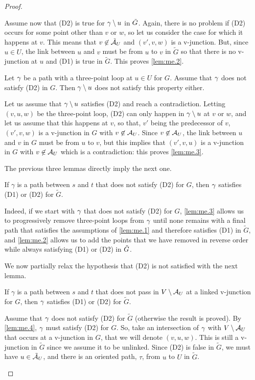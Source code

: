 \begin{proof}
\begin{enumerate}[label={\it Step \arabic*.}]
Assume now that (D2) is true for $\gamma\setminus u$ in ${\tilde{G}}$. Again, there
is no problem if (D2) occurs for some point other than $v$ or $w$, so
let us consider the case for which it happens at $v$. This means that 
$v\not\in \tilde {{\mathcal A}}_U$ and $(v',v,w)$ is a v-junction. But, since
$u\in U$, the link between $u$ and $v$ must be from $u$ to $v$ in
$\tilde G$ so that
there is no v-junction at $u$ and (D1) is true in $\tilde G$. This proves 
\cref{lem:me.2}.

\begin{lemma}
\label{lem:me.3}
Let $\gamma$ be a path with a three-point loop at
$u\in U$ for $G$. Assume that $\gamma$ does not satisfy (D2) in $G$. Then
$\gamma\setminus u$ does not satisfy this property either.
\end{lemma}
Let us assume that $\gamma\setminus u$ satisfies (D2) and reach a
contradiction. Letting $(v,u,w)$ be the three-point loop, (D2) can only
happen in $\gamma\setminus u$ at $v$ or $w$, and let us assume that this
happens at $v$, so that, $v'$ being the predecessor of $v$, $(v',v,w)$
is a v-junction in $G$ with $v\not\in {\mathcal A}_U$. Since $v\not\in {\mathcal A}_U$,
the link between $u$ and $v$ in $G$ must be from $u$ to $v$, but this
implies that $(v',v,u)$ is a v-junction in $G$ with $v \not \in {\mathcal A}_U$
which is a contradiction: this proves  \cref{lem:me.3}.


The previous three lemmas directly imply the next one.
\begin{lemma}
\label{lem:me.4}
If
$\gamma$ is a path between $s$ and $t$ that does not satisfy (D2) for
$G$, then $\gamma$ satisfies
(D1) or (D2) for $\tilde G$. 
\end{lemma}
Indeed, if we start with $\gamma$ that does not satisfy (D2) for $G$, 
 \cref{lem:me.3} allows us to progressively remove three-point loops from
$\gamma$ until none remains with a final path that satisfies the
assumptions of  \cref{lem:me.1} and therefore satisfies (D1) in $\tilde G$,
and  \cref{lem:me.2} allows us to add the points that we have
removed in reverse order while always satisfying (D1) or (D2) in ${\tilde{G}}$.


We now partially relax the hypothesis that (D2) is not satisfied with the next lemma.
\begin{lemma}
\label{lem:me.5}
If
$\gamma$ is a path between $s$ and $t$ that does not pass in $V\setminus
{\mathcal A}_U$ at a linked v-junction for $G$, then $\gamma$ satisfies
(D1) or (D2) for $\tilde G$. 
\end{lemma}
Assume that $\gamma$  does not satisfy (D2) for
$\tilde G$ (otherwise the result is proved). By  \cref{lem:me.4},  $\gamma$ must satisfy
(D2) for $G$. So, take an intersection of $\gamma$ with $V\setminus {\mathcal A}_U$ that
occurs at a v-junction in $G$, that we will denote $(v, u, w)$. This is
still a v-junction in $\tilde G$ since we assume it to be
unlinked. Since (D2) is false in $\tilde G$, we must have
$u\in \tilde {{\mathcal A}}_U$, and there is an oriented path, $\tau$, from
$u$ to $U$ in $\tilde G$. 


\end{enumerate}
\end{proof}
